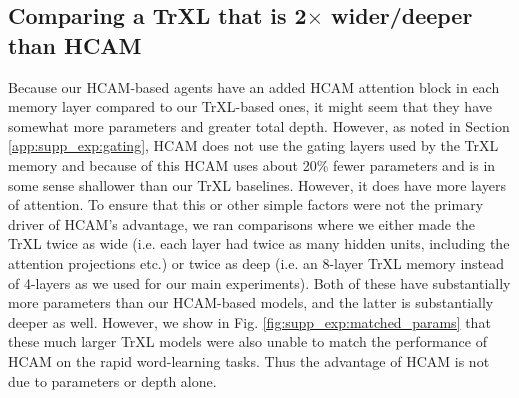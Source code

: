 \subsection{Comparing a TrXL that is 2\(\times\) wider/deeper than HCAM} \label{app:supp_exp:matched_params}

Because our HCAM-based agents have an added HCAM attention block in each memory layer compared to our TrXL-based ones, it might seem that they have somewhat more parameters and greater total depth. However, as noted in Section \ref{app:supp_exp:gating}, HCAM does not use the gating layers used by the TrXL memory \citep{parisotto2020stabilizing} and because of this HCAM uses about 20\% fewer parameters and is in some sense shallower than our TrXL baselines. However, it does have more layers of attention. To ensure that this or other simple factors were not the primary driver of HCAM's advantage, we ran comparisons where we either made the TrXL twice as wide (i.e. each layer had twice as many hidden units, including the attention projections etc.) or twice as deep (i.e. an 8-layer TrXL memory instead of 4-layers as we used for our main experiments). Both of these have substantially more parameters than our HCAM-based models, and the latter is substantially deeper as well. However, we show in Fig. \ref{fig:supp_exp:matched_params} that these much larger TrXL models were also unable to match the performance of HCAM on the rapid word-learning tasks. Thus the advantage of HCAM is not due to parameters or depth alone.

